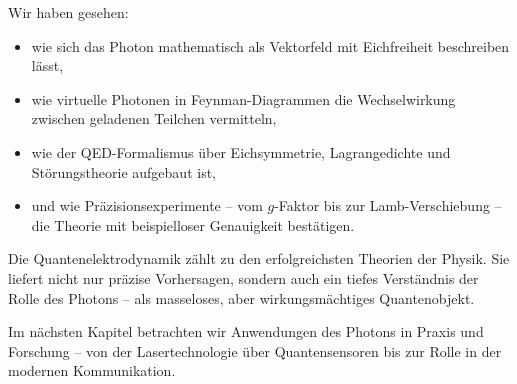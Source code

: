 Wir haben gesehen:
\begin{itemize}
	\item wie sich das Photon mathematisch als Vektorfeld mit Eichfreiheit beschreiben lässt,
	\item wie virtuelle Photonen in Feynman-Diagrammen die Wechselwirkung zwischen geladenen Teilchen vermitteln,
	\item wie der QED-Formalismus über Eichsymmetrie, Lagrangedichte und Störungstheorie aufgebaut ist,
	\item und wie Präzisionsexperimente – vom $g$-Faktor bis zur Lamb-Verschiebung – die Theorie mit beispielloser Genauigkeit bestätigen.
\end{itemize}

Die Quantenelektrodynamik zählt zu den erfolgreichsten Theorien der Physik. Sie liefert nicht nur präzise Vorhersagen, sondern auch ein tiefes Verständnis der Rolle des Photons – als masseloses, aber wirkungsmächtiges Quantenobjekt. 

\medskip
\begin{tcolorbox}[hinweisbox,title=Ausblick auf Kapitel VI]
	\label{box:Ausblick auf Kapitel 6}
	Im nächsten Kapitel betrachten wir Anwendungen des Photons in Praxis und Forschung – von der Lasertechnologie über Quantensensoren bis zur Rolle in der modernen Kommunikation.
\end{tcolorbox}

